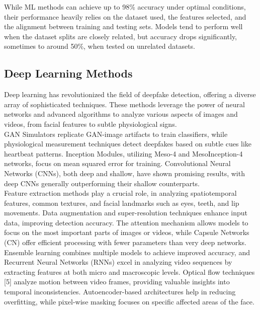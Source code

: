 \documentclass[conference]{IEEEtran}
\begin{document}
            While ML methods can achieve up to 98\% accuracy under optimal conditions, their performance heavily relies on the dataset used, the features selected, and the alignment between training and testing sets. Models tend to perform well when the dataset splits are closely related, but accuracy drops significantly, sometimes to around 50\%, when tested on unrelated datasets.
            
            \subsection{Deep Learning Methods}
            
            Deep learning has revolutionized the field of deepfake detection, offering a diverse array of sophisticated techniques. These methods leverage the power of neural networks and advanced algorithms to analyze various aspects of images and videos, from facial features to subtle physiological signs. \\
            
            GAN Simulators replicate GAN-image artifacts to train classifiers, while physiological measurement techniques detect deepfakes based on subtle cues like heartbeat patterns. Inception Modules, utilizing Meso-4 and MesoInception-4 networks, focus on mean squared error for training. Convolutional Neural Networks (CNNs), both deep and shallow, have shown promising results, with deep CNNs generally outperforming their shallow counterparts. \\
            
            Feature extraction methods play a crucial role, in analyzing spatiotemporal features, common textures, and facial landmarks such as eyes, teeth, and lip movements. Data augmentation and super-resolution techniques enhance input data, improving detection accuracy. The attention mechanism allows models to focus on the most important parts of images or videos, while Capsule Networks (CN) offer efficient processing with fewer parameters than very deep networks. \\
            
            Ensemble learning combines multiple models to achieve improved accuracy, and Recurrent Neural Networks (RNNs) excel in analyzing video sequences by extracting features at both micro and macroscopic levels. Optical flow techniques [5] analyze motion between video frames, providing valuable insights into temporal inconsistencies. Autoencoder-based architectures help in reducing overfitting, while pixel-wise masking focuses on specific affected areas of the face. \\
            
\end{document}
